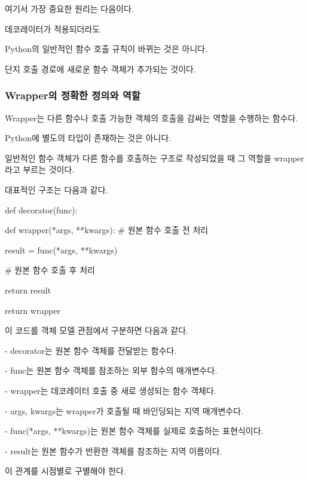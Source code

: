 여기서 가장 중요한 원리는 다음이다.

\begin{dhksmry}[centered]
데코레이터가 적용되더라도 

Python의 일반적인 함수 호출 규칙이 바뀌는 것은 아니다.

단지 호출 경로에 새로운 함수 객체가 추가되는 것이다.
\end{dhksmry}

\subsubsection{Wrapper의 정확한 정의와 역할}

Wrapper는 다른 함수나 호출 가능한 객체의 호출을 감싸는 역할을 수행하는 함수다.

Python에 별도의  타입이 존재하는 것은 아니다.

일반적인 함수 객체가 다른 함수를 호출하는 구조로 작성되었을 때 그 역할을 wrapper라고 부르는 것이다.

대표적인 구조는 다음과 같다.

\begin{dhkcode}
def decorator(func):

    def wrapper(*args, **kwargs):
        # 원본 함수 호출 전 처리

        result = func(*args, **kwargs)

        # 원본 함수 호출 후 처리

        return result

    return wrapper
\end{dhkcode}

이 코드를 객체 모델 관점에서 구분하면 다음과 같다.

\begin{dhksmry}
    - decorator는 원본 함수 객체를 전달받는 함수다.

    - func는 원본 함수 객체를 참조하는 외부 함수의 매개변수다.

    - wrapper는 데코레이터 호출 중 새로 생성되는 함수 객체다.

    - args, kwargs는 wrapper가 호출될 때 바인딩되는 지역 매개변수다.

    - func(*args, **kwargs)는 원본 함수 객체를 실제로 호출하는
      표현식이다.

    - result는 원본 함수가 반환한 객체를 참조하는 지역 이름이다.
\end{dhksmry}

이 관계를 시점별로 구별해야 한다.



